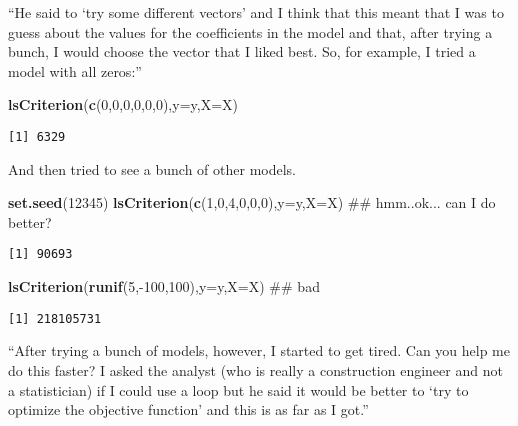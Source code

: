 \documentclass[10pt,]{article}
\newenvironment{Shaded}{\begin{snugshade}}{\end{snugshade}}
\newcommand{\KeywordTok}[1]{\textcolor[rgb]{0.13,0.29,0.53}{\textbf{{#1}}}}
\newcommand{\DataTypeTok}[1]{\textcolor[rgb]{0.13,0.29,0.53}{{#1}}}
\newcommand{\DecValTok}[1]{\textcolor[rgb]{0.00,0.00,0.81}{{#1}}}
\newcommand{\NormalTok}[1]{{#1}}
\begin{document}
``He said to `try some different vectors' and I think that this meant
that I was to guess about the values for the coefficients in the model
and that, after trying a bunch, I would choose the vector that I liked
best. So, for example, I tried a model with all zeros:''

\begin{Shaded}
\begin{Highlighting}[]
\KeywordTok{lsCriterion}\NormalTok{(}\KeywordTok{c}\NormalTok{(}\DecValTok{0}\NormalTok{,}\DecValTok{0}\NormalTok{,}\DecValTok{0}\NormalTok{,}\DecValTok{0}\NormalTok{,}\DecValTok{0}\NormalTok{,}\DecValTok{0}\NormalTok{),}\DataTypeTok{y=}\NormalTok{y,}\DataTypeTok{X=}\NormalTok{X)}
\end{Highlighting}
\end{Shaded}

\begin{verbatim}
[1] 6329
\end{verbatim}

And then tried to see a bunch of other models.

\begin{Shaded}
\begin{Highlighting}[]
\KeywordTok{set.seed}\NormalTok{(}\DecValTok{12345}\NormalTok{)}
\KeywordTok{lsCriterion}\NormalTok{(}\KeywordTok{c}\NormalTok{(}\DecValTok{1}\NormalTok{,}\DecValTok{0}\NormalTok{,}\DecValTok{4}\NormalTok{,}\DecValTok{0}\NormalTok{,}\DecValTok{0}\NormalTok{,}\DecValTok{0}\NormalTok{),}\DataTypeTok{y=}\NormalTok{y,}\DataTypeTok{X=}\NormalTok{X) ## hmm..ok... can I do better?}
\end{Highlighting}
\end{Shaded}

\begin{verbatim}
[1] 90693
\end{verbatim}

\begin{Shaded}
\begin{Highlighting}[]
\KeywordTok{lsCriterion}\NormalTok{(}\KeywordTok{runif}\NormalTok{(}\DecValTok{5}\NormalTok{,-}\DecValTok{100}\NormalTok{,}\DecValTok{100}\NormalTok{),}\DataTypeTok{y=}\NormalTok{y,}\DataTypeTok{X=}\NormalTok{X) ## bad}
\end{Highlighting}
\end{Shaded}

\begin{verbatim}
[1] 218105731
\end{verbatim}

``After trying a bunch of models, however, I started to get tired. Can
you help me do this faster? I asked the analyst (who is really a
construction engineer and not a statistician) if I could use a loop but
he said it would be better to `try to optimize the objective function'
and this is as far as I got.''
\end{document}

